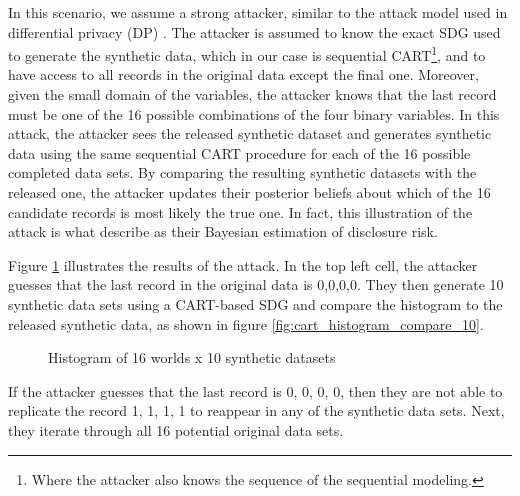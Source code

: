 \documentclass[a4paper,11pt]{style/uneceart}
\begin{document}
In this scenario, we assume a strong attacker, similar to the attack model used in differential privacy (DP) \citep{dwork2006calibrating}. The attacker is assumed to know the exact SDG used to generate the synthetic data, which in our case is sequential CART\footnote{Where the attacker also knows the sequence of the sequential modeling.}, and to have access to all records in the original data except the final one. Moreover, given the small domain of the variables, the attacker knows that the last record must be one of the 16 possible combinations of the four binary variables. In this attack, the attacker sees the released synthetic dataset and generates synthetic data using the same sequential CART procedure for each of the 16 possible completed data sets. By comparing the resulting synthetic datasets with the released one, the attacker updates their posterior beliefs about which of the 16 candidate records is most likely the true one. In fact, this illustration of the attack is what \citet{reiter2014bayesian} describe as their Bayesian estimation of disclosure risk.

Figure \ref{fig:attacker_default} illustrates the results of the attack.  In the top left cell, the attacker guesses that the last record in the original data is 0,0,0,0.  They then generate 10 synthetic data sets using a CART-based SDG and compare the histogram to the released synthetic data, as shown in figure \ref{fig:cart_histogram_compare_10}.  

\begin{figure}[!h]
    \centering
    \caption{Histogram of 16 worlds x 10 synthetic datasets}
    \label{fig:attacker_default}
\end{figure}

If the attacker guesses that the last record is 0, 0, 0, 0, then they are not able to replicate the record 1, 1, 1, 1 to reappear in any of the synthetic data sets.  Next, they iterate through all 16 potential original data sets. 
\end{document}

